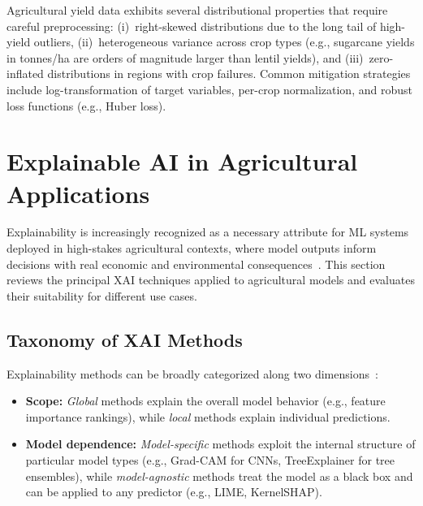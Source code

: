 \documentclass[journal]{IEEEtran}
\begin{document}
Agricultural yield data exhibits several distributional properties that require careful preprocessing: (i)~right-skewed distributions due to the long tail of high-yield outliers, (ii)~heterogeneous variance across crop types (e.g., sugarcane yields in tonnes/ha are orders of magnitude larger than lentil yields), and (iii)~zero-inflated distributions in regions with crop failures. Common mitigation strategies include log-transformation of target variables, per-crop normalization, and robust loss functions (e.g., Huber loss).


\section{Explainable AI in Agricultural Applications}
\label{sec:xai}

Explainability is increasingly recognized as a necessary attribute for ML systems deployed in high-stakes agricultural contexts, where model outputs inform decisions with real economic and environmental consequences~\cite{arrieta2020explainable}. This section reviews the principal XAI techniques applied to agricultural models and evaluates their suitability for different use cases.

\subsection{Taxonomy of XAI Methods}

Explainability methods can be broadly categorized along two dimensions~\cite{linardatos2021explainable,samek2021explaining}:

\begin{itemize}[leftmargin=*]
  \item \textbf{Scope:} \textit{Global} methods explain the overall model behavior (e.g., feature importance rankings), while \textit{local} methods explain individual predictions.
  
  \item \textbf{Model dependence:} \textit{Model-specific} methods exploit the internal structure of particular model types (e.g., Grad-CAM for CNNs, TreeExplainer for tree ensembles), while \textit{model-agnostic} methods treat the model as a black box and can be applied to any predictor (e.g., LIME, KernelSHAP).
\end{itemize}
\end{document}
